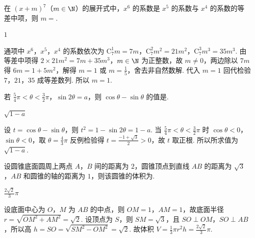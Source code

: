 \begin{problem}
在 \(\left( x+m \right)^{7}\)（\(m\in\N\)）的展开式中，\(x^{6}\) 的系数是 \(x^{5}\) 的系数与 \(x^{4}\) 的系数的等差中项，则 \(m=\)\fillinblank{}.
\end{problem}

\begin{answer}
\(1\)
\end{answer}

\begin{solution}
通项中 \(x^{6}\)，\(x^{5}\)，\(x^{4}\) 的系数依次为 \(\mathrm C_{7}^{1}m=7m\)，\(\mathrm C_{7}^{2}m^{2}=21m^{2}\)，\(\mathrm C_{7}^{3}m^{3}=35m^{3}\). 由等差中项得 \(2\times 21m^{2}=7m+35m^{3}\)，\(m\in\N\) 为正整数，故 \(m\ne 0\)，两边除以 \(7m\) 得 \(6m=1+5m^{2}\)，解得 \(m=1\) 或 \(m=\frac{1}{5}\)，舍去非自然数解. 代入 \(m=1\) 回代检验 \(7\)，\(21\)，\(35\) 成等差数列. 所以 \(m=1\).
\end{solution}

\begin{problem}
若 \(\frac{5}{4}\pi<\theta<\frac{3}{2}\pi\)，\(\sin 2\theta=a\)，则 \(\cos\theta-\sin\theta\) 的值是\fillinblank{}.
\end{problem}

\begin{answer}
\(\sqrt{1-a}\)
\end{answer}

\begin{solution}
设 \(t=\cos\theta-\sin\theta\)，则 \(t^{2}=1-\sin 2\theta=1-a\). 当 \(\frac{5}{4}\pi<\theta<\frac{3}{2}\pi\) 时 \(\cos\theta<0\)，\(\sin\theta<0\)，取 \(\theta=\frac{4}{3}\pi\) 反例检验得 \(t=\frac{-1+\sqrt{3}}{2}>0\)，故 \(t\) 取正根. 所以所求值为 \(\sqrt{1-a}\).
\end{solution}

\begin{problem}
设圆锥底面圆周上两点 \(A\)，\(B\) 间的距离为 \(2\)，圆锥顶点到直线 \(AB\) 的距离为 \(\sqrt{3}\)，\(AB\) 和圆锥的轴的距离为 \(1\)，则该圆锥的体积为\fillinblank{}.
\end{problem}

\begin{answer}
\(\frac{2\sqrt{2}}{3}\pi\)
\end{answer}

\begin{solution}
设底面中心为 \(O\)，\(M\) 为 \(AB\) 的中点，则 \(OM=1\)，\(AM=1\)，故底面半径 \(r=\sqrt{OM^{2}+AM^{2}}=\sqrt{2}\). 设顶点为 \(S\)，则 \(SM=\sqrt{3}\)，且 \(SO\perp OM\)，\(SO\perp AB\)，所以高 \(h=SO=\sqrt{SM^{2}-OM^{2}}=\sqrt{2}\). 故体积 \(V=\frac{1}{3}\pi r^{2}h=\frac{2\sqrt{2}}{3}\pi\).
\end{solution}

